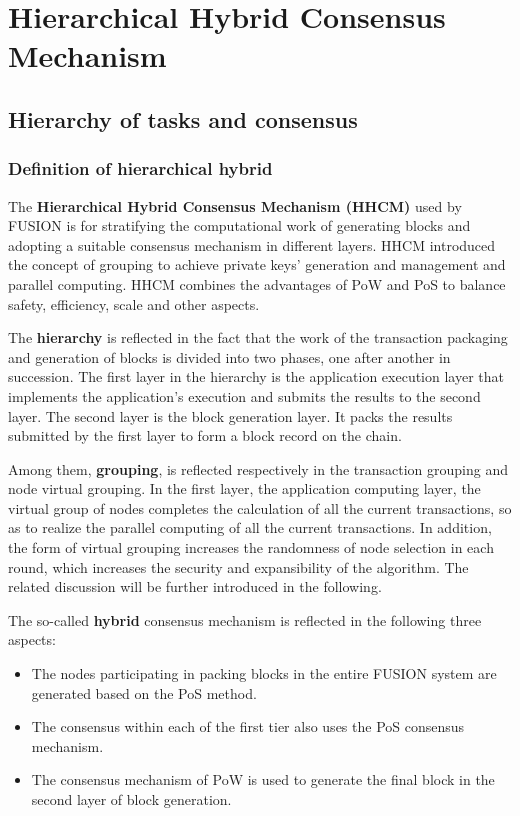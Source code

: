 \documentclass[a4paper,12pt]{article}
\begin{document}
\section{Hierarchical Hybrid Consensus Mechanism}

\subsection{Hierarchy of tasks and consensus}

\subsubsection{Definition of hierarchical hybrid}

The {\bfseries Hierarchical Hybrid Consensus Mechanism (HHCM)} used by FUSION is for stratifying the computational work of generating blocks and adopting a suitable consensus mechanism in different layers. HHCM introduced the concept of grouping to achieve private keys' generation and management and parallel computing. HHCM combines the advantages of PoW and PoS to balance safety, efficiency, scale and other aspects.

The {\bfseries hierarchy} is reflected in the fact that the work of the transaction packaging and generation of blocks is divided into two phases, one after another in succession. The first layer in the hierarchy is the application execution layer that implements the application's execution and submits the results to the second layer. The second layer is the block generation layer. It packs the results submitted by the first layer to form a block record on the chain.

Among them, {\bfseries grouping}, is reflected respectively in the transaction grouping and node virtual grouping. In the first layer, the application computing layer, the virtual group of nodes completes the calculation of all the current transactions, so as to realize the parallel computing of all the current transactions. In addition, the form of virtual grouping increases the randomness of node selection in each round, which increases the security and expansibility of the algorithm. The related discussion will be further introduced in the following.

The so-called {\bfseries hybrid } consensus mechanism is reflected in the following three aspects:
\begin{itemize} [itemindent = 1em]
\item The nodes participating in packing blocks in the entire FUSION system are generated based on the PoS method.
\item The consensus within each of the first tier also uses the PoS consensus mechanism.
\item The consensus mechanism of PoW is used to generate the final block in the second layer of block generation.
\end{itemize}
\end{document}
